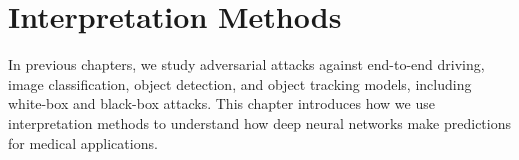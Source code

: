 \chapter{Interpretation Methods}
\label{chpt:defence}


In previous chapters, we study adversarial attacks against end-to-end driving, image classification, object detection, and object tracking models, including white-box and black-box attacks. This chapter introduces how we use interpretation methods to understand how deep neural networks make predictions for medical applications.








